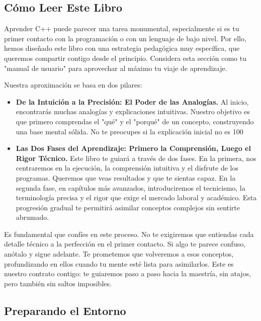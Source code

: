 \subsection{Cómo Leer Este Libro}
\label{sec:como_leer}

Aprender C++ puede parecer una tarea monumental, especialmente si es tu primer contacto con la programación o con un lenguaje de bajo nivel. Por ello, hemos diseñado este libro con una estrategia pedagógica muy específica, que queremos compartir contigo desde el principio. Considera esta sección como tu "manual de usuario" para aprovechar al máximo tu viaje de aprendizaje.

Nuestra aproximación se basa en dos pilares:
\begin{itemize}
    \item \textbf{De la Intuición a la Precisión: El Poder de las Analogías.} Al inicio, encontrarás muchas analogías y explicaciones intuitivas. Nuestro objetivo es que primero comprendas el "qué" y el "porqué" de un concepto, construyendo una base mental sólida. No te preocupes si la explicación inicial no es 100%
    \item \textbf{Las Dos Fases del Aprendizaje: Primero la Comprensión, Luego el Rigor Técnico.} Este libro te guiará a través de dos fases. En la primera, nos centraremos en la ejecución, la comprensión intuitiva y el disfrute de los programas. Queremos que veas resultados y que te sientas capaz. En la segunda fase, en capítulos más avanzados, introduciremos el tecnicismo, la terminología precisa y el rigor que exige el mercado laboral y académico. Esta progresión gradual te permitirá asimilar conceptos complejos sin sentirte abrumado.
\end{itemize}

Es fundamental que confíes en este proceso. No te exigiremos que entiendas cada detalle técnico a la perfección en el primer contacto. Si algo te parece confuso, anótalo y sigue adelante. Te prometemos que volveremos a esos conceptos, profundizando en ellos cuando tu mente esté lista para asimilarlos. Este es nuestro contrato contigo: te guiaremos paso a paso hacia la maestría, sin atajos, pero también sin saltos imposibles.

\subsection{Preparando el Entorno}
\label{sec:entorno}

